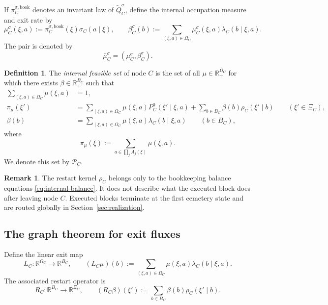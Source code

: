 \documentclass[12pt]{article}
\theoremstyle{definition}
\newtheorem{definition}[theorem]{Definition}
\newtheorem{remark}[theorem]{Remark}
\newcommand{\R}{\mathbb{R}}
\newcommand{\1}{\mathbf{1}}
\newcommand{\cP}{\mathcal{P}}
\begin{document}
If $\pi_C^{\sigma,\mathrm{book}}$ denotes an invariant law of
$\widetilde Q_C^{\sigma}$, define the internal occupation measure and exit rate by
\[
\mu_C^{\sigma}(\xi,a):=\pi_C^{\sigma,\mathrm{book}}(\xi)\sigma_C(a\mid\xi),
\qquad
\beta_C^{\sigma}(b):=\sum_{(\xi,a)\in\Omega_C}
\mu_C^{\sigma}(\xi,a)\lambda_C(b\mid\xi,a).
\]
The pair is denoted by
\[
\bar\mu_C^{\sigma}=(\mu_C^{\sigma},\beta_C^{\sigma}).
\]


\begin{definition}
\label{def:PC}
The \emph{internal feasible set} of node $C$ is the set of all
$\mu\in\R_+^{\Omega_C}$ for which there exists $\beta\in\R_+^{B_C}$ such that
\begin{align}
\sum_{(\xi,a)\in\Omega_C}\mu(\xi,a)&=1,
\label{eq:norm-PC}
\\
\pi_\mu(\xi')
&=
\sum_{(\xi,a)\in\Omega_C}\mu(\xi,a)P_C^0(\xi'\mid\xi,a)
+
\sum_{b\in B_C}\beta(b)\rho_C(\xi'\mid b)
\qquad (\xi'\in\Xi_C),
\label{eq:internal-balance}
\\
\beta(b)
&=
\sum_{(\xi,a)\in\Omega_C}\mu(\xi,a)\lambda_C(b\mid\xi,a)
\qquad (b\in B_C),
\label{eq:beta-balance}
\end{align}
where
\[
\pi_\mu(\xi):=\sum_{a\in\prod_j A_j(\xi)}\mu(\xi,a).
\]
We denote this set by $\cP_C$.
\end{definition}


\begin{remark}
The restart kernel $\rho_C$ belongs only to the bookkeeping balance equations
\eqref{eq:internal-balance}. It does not describe what the executed block does
after leaving node $C$. Executed blocks terminate at the first cemetery state and
are routed globally in Section~\ref{sec:realization}.
\end{remark}

\subsection{The graph theorem for exit fluxes}

Define the linear exit map
\begin{equation}
\label{eq:LC-def}
L_C:\R^{\Omega_C}\to \R^{B_C},
\qquad
(L_C\mu)(b):=
\sum_{(\xi,a)\in\Omega_C}\mu(\xi,a)\lambda_C(b\mid\xi,a).
\end{equation}
The associated restart operator is
\begin{equation}
\label{eq:RC-def}
R_C:\R^{B_C}\to \R^{\Xi_C},
\qquad
(R_C\beta)(\xi'):=\sum_{b\in B_C}\beta(b)\rho_C(\xi'\mid b).
\end{equation}
\end{document}
